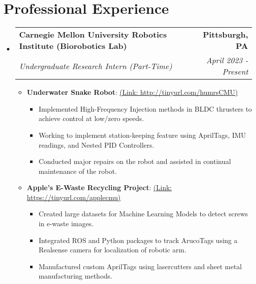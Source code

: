 \documentclass[letterpaper,10pt]{article}
\makeatletter
\newcommand{\resumeItem}[2]{
  \item\small{
    \textbf{#1}{: #2 \vspace{-2pt}}
  }
}
\newcommand{\resumeSubheading}[4]{
  \vspace{-1pt}\item
    \begin{tabular*}{0.97\textwidth}{l@{\extracolsep{\fill}}r}
      \textbf{#1} & \textbf{#2} \\
      \textit{#3} & \textit{#4} \\
    \end{tabular*}\vspace{-5pt}
}
\newcommand{\resumeSubHeadingListStart}{\begin{itemize}[leftmargin=*]}
\newcommand{\resumeSubHeadingListEnd}{\end{itemize}}
\newcommand{\resumeItemListStart}{
  \begin{itemize}
    \setlength\itemsep{0mm}
}
\newcommand{\resumeItemListEnd}{\end{itemize}\vspace{-5pt}}
\makeatother
\begin{document}
\section{Professional Experience}
    \resumeSubHeadingListStart
        \resumeSubheading
            {Carnegie Mellon University Robotics Institute (Biorobotics Lab)}{Pittsburgh, PA}
            {Undergraduate Research Intern (Part-Time)}{April 2023 -  Present}
            \resumeItemListStart
                \resumeItem{Underwater Snake Robot}
                    {\href{http://tinyurl.com/humrsCMU}{(Link: http://tinyurl.com/humrsCMU)}}
                    \begin{itemize}
                      \item Implemented High-Frequency Injection methods in BLDC thrusters to achieve control at low/zero speeds.
                      \item Working to implement station-keeping feature using AprilTags, IMU readings, and Nested PID Controllers.
                      \item Conducted major repairs on the robot and assisted in continual maintenance of the robot.
                    \end{itemize}
                \resumeItem{Apple's E-Waste Recycling Project}
                    {\href{https://tinyurl.com/applecmu}{(Link: https://tinyurl.com/applecmu)}}
                    \begin{itemize}
                      \item Created large datasets for Machine Learning Models to detect screws in e-waste images.
                      \item Integrated ROS and Python packages to track ArucoTags using a Realsense camera for localization of robotic arm.
                      \item Manufactured custom AprilTags using lasercutters and sheet metal manufacturing methods.
                    \end{itemize}
            \resumeItemListEnd
      \resumeSubHeadingListEnd
\vspace{-5pt}
\end{document}

